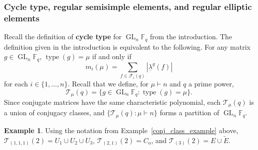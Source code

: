 \documentclass[10pt]{article}
\theoremstyle{definition}
\newtheorem{example}[theorem]{Example}
\DeclareMathOperator{\GL}{GL}
\DeclareMathOperator{\type}{type}
\newcommand{\F}{\mathbb{F}}
\newcommand{\CF}{\mathcal{F}}
\newcommand{\CT}{\mathcal{T}}
\newcommand{\myemph}{\textbf}
\newcommand{\ulambda}{{\underline{\lambda}}}
\begin{document}
\subsubsection{Cycle type, regular semisimple elements, and regular elliptic elements}
\label{cycle_rs_re}

Recall the definition of \myemph{cycle type} for \(\GL_n \F_q\) from the introduction.
The definition given in the introduction is equivalent to the following.
For any matrix \(g \in \GL_n \F_q\), \(\type (g) = \mu\) if and only if
\[
m_i (\mu)
=
\sum_{f \in \CF_i (q)}
| \ulambda^g (f) |
\]
for each \(i \in \{1,\ldots,n\}\).
Recall that we define, for \(\mu \vdash n\) and \(q\) a prime power,
\begin{equation}
\label{type_set}
\CT_\mu (q) = \{g \in \GL_n \F_q : \type (g) = \mu \}.
\end{equation}
Since conjugate matrices have the same characteristic polynomial, each $\CT_\mu (q)$ is a union of conjugacy classes, and $\{\CT_\mu (q): \mu \vdash n\}$ forms a partition of $\GL_n \F_q$.
\begin{example}
Using the notation from Example~\ref{conj_class_example} above,
\(\CT_{(1,1,1)} (2) = U_1 \cup U_2 \cup U_3\),
\(\CT_{(2,1)} (2) = C_{\mathrm{o}}\), and
\(\CT_{(3)} (2) = E \cup \tilde{E}\).
\end{example}
\end{document}
